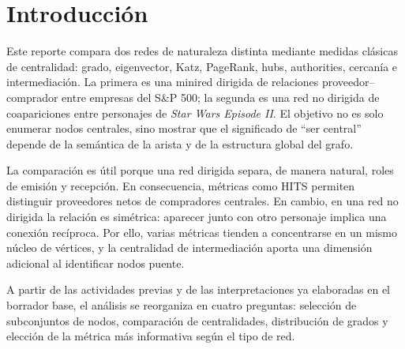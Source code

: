 \section{Introducción}

Este reporte compara dos redes de naturaleza distinta mediante medidas clásicas de centralidad: grado, eigenvector, Katz, PageRank, hubs, authorities, cercanía e intermediación. La primera es una minired dirigida de relaciones proveedor--comprador entre empresas del S\&P 500; la segunda es una red no dirigida de coapariciones entre personajes de \textit{Star Wars Episode II}. El objetivo no es solo enumerar nodos centrales, sino mostrar que el significado de ``ser central'' depende de la semántica de la arista y de la estructura global del grafo.

La comparación es útil porque una red dirigida separa, de manera natural, roles de emisión y recepción. En consecuencia, métricas como HITS permiten distinguir proveedores netos de compradores centrales. En cambio, en una red no dirigida la relación es simétrica: aparecer junto con otro personaje implica una conexión recíproca. Por ello, varias métricas tienden a concentrarse en un mismo núcleo de vértices, y la centralidad de intermediación aporta una dimensión adicional al identificar nodos puente.

A partir de las actividades previas y de las interpretaciones ya elaboradas en el borrador base, el análisis se reorganiza en cuatro preguntas: selección de subconjuntos de nodos, comparación de centralidades, distribución de grados y elección de la métrica más informativa según el tipo de red.
